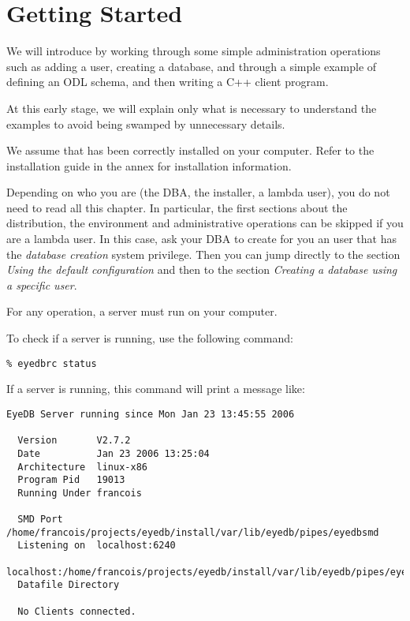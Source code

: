 

\newcommand{\mantitle}{\textsc{Getting Started}}


\tableofcontents

\newcommand{\EYEDBARCH}{\emph{eyedbtop}/\texttt{eyedb-V\eyedbversion}/\emph{archdir}}

\chapter*{Getting Started}

We will introduce \eyedb by working through some simple administration
operations such as adding a user, creating a database, and through
a simple example of defining an ODL schema, and then writing a C++
client program.

At this early stage, we will explain only what is necessary to understand
the examples to avoid being swamped by unnecessary details.

We assume that \eyedb has been correctly installed on your
computer.
Refer to the installation guide in the annex for installation information.

Depending on who you are (the DBA, the installer, a lambda user), you do not need
to read all this chapter. In particular, the first sections about the
distribution, the environment and administrative operations 
can be skipped if you are a lambda user. In this case, ask your DBA to create
for you an \eyedb user that has the \emph{database creation} system privilege. 
Then you can jump directly to the section
\emph{Using the default configuration} and then to the section
\emph{Creating a database using a specific user}.






For any \eyedb operation, a server must run on your computer.

To check if a server is running, use the following command:
\verbsize \begin{verbatim}
% eyedbrc status
\end{verbatim}
\normalsize
If a server is running, this command will print a message like:
\verbsize \begin{verbatim}
EyeDB Server running since Mon Jan 23 13:45:55 2006

  Version       V2.7.2
  Date          Jan 23 2006 13:25:04
  Architecture  linux-x86
  Program Pid   19013
  Running Under francois

  SMD Port      /home/francois/projects/eyedb/install/var/lib/eyedb/pipes/eyedbsmd
  Listening on  localhost:6240
                localhost:/home/francois/projects/eyedb/install/var/lib/eyedb/pipes/eyedbd
  Datafile Directory 

  No Clients connected.
\end{verbatim}
\normalsize

